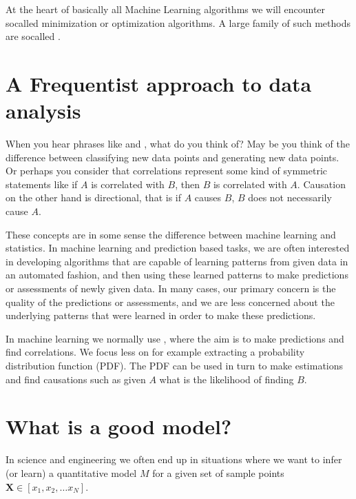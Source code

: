 \documentclass[letterpaper,10pt,english]{sphinxmanual}
\begin{document}
At the heart of basically all Machine Learning algorithms we will encounter so\sphinxhyphen{}called minimization or optimization algorithms. A large family of such methods are so\sphinxhyphen{}called .


\chapter{A Frequentist approach to data analysis}
\label{\detokenize{chapter1:a-frequentist-approach-to-data-analysis}}
When you hear phrases like  and
, what do you think of?  May be you think
of the difference between classifying new data points and generating
new data points.
Or perhaps you consider that correlations represent some kind of symmetric statements like
if \(A\) is correlated with \(B\), then \(B\) is correlated with
\(A\). Causation on the other hand is directional, that is if \(A\) causes \(B\), \(B\) does not
necessarily cause \(A\).

These concepts are in some sense the difference between machine
learning and statistics. In machine learning and prediction based
tasks, we are often interested in developing algorithms that are
capable of learning patterns from given data in an automated fashion,
and then using these learned patterns to make predictions or
assessments of newly given data. In many cases, our primary concern
is the quality of the predictions or assessments, and we are less
concerned about the underlying patterns that were learned in order
to make these predictions.

In machine learning we normally use ,
where the aim is to make predictions and find correlations. We focus
less on for example extracting a probability distribution function (PDF). The PDF can be
used in turn to make estimations and find causations such as given \(A\)
what is the likelihood of finding \(B\).


\chapter{What is a good model?}
\label{\detokenize{chapter1:what-is-a-good-model}}
In science and engineering we often end up in situations where we want to infer (or learn) a
quantitative model \(M\) for a given set of sample points \(\boldsymbol{X} \in [x_1, x_2,\dots x_N]\).
\end{document}
